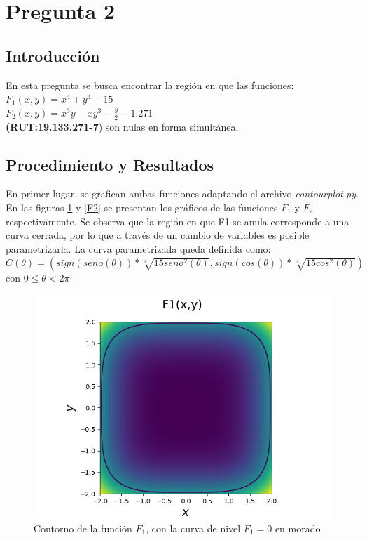 \documentclass[a4paper, 11pt, spanish]{article}
\begin{document}
\pagebreak
\section{Pregunta 2}

\subsection{Introducci\'on}
En esta pregunta se busca encontrar la región en que las funciones:\\
 $F_1(x,y) = x^4 + y^4 - 15$\\
 $F_2(x,y) = x^3y - xy^3 - \frac{y}{2} - 1.271$\\
\textbf{(RUT:19.133.271-7}) son nulas en forma simultánea. 

\subsection{Procedimiento y Resultados}
En primer lugar, se grafican ambas funciones adaptando el archivo \textit{contourplot.py}. En las figuras \ref{F1} y \ref{F2} se presentan los gráficos de las funciones $F_1$ y $F_2$ respectivamente. Se observa que la región en que F1 se anula corresponde a una curva cerrada, por lo que a través de un cambio de variables es posible parametrizarla. La curva parametrizada queda definida como:\\
 $C(\theta) = (sign(seno(\theta))*\sqrt[4]{15 seno^2(\theta)},sign(cos(\theta))*\sqrt[4]{15 cos^2(\theta)}) $ con $ 0 \leq \theta < 2 \pi$ \\
 
\begin{figure}[h]
\centering
\includegraphics[scale=0.5]{contornoF1.png}
\caption{Contorno de la función $F_1$, con la curva de nivel $F_1 = 0$ en morado} 
\label{F1}
\end{figure} 
\end{document}
